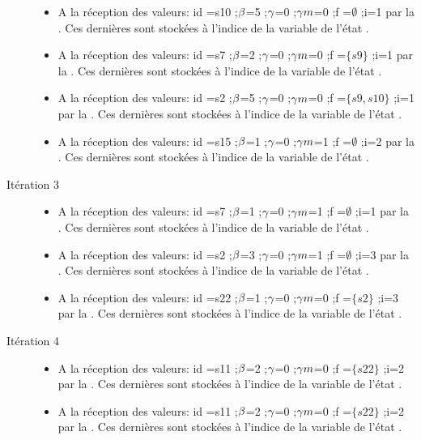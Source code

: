 \begin{Exemple}
\begin{description}
\begin{itemize}
			\item  A la réception des valeurs: id =s10 ;$\beta{}$=5 ;$\gamma{}$=0 ;$\gamma m{}$=0 ;f =$\emptyset$ ;i=1 par la \mtwo{}. Ces dernières sont stockées à l'indice  de la variable   de l'état .
			\item  A la réception des valeurs: id =s7 ;$\beta{}$=2 ;$\gamma{}$=0 ;$\gamma m{}$=0 ;f =$\{s9\}$ ;i=1 par la \mtwo{}. Ces dernières sont stockées à l'indice  de la variable   de l'état .
			\item  A la réception des valeurs: id =s2 ;$\beta{}$=5 ;$\gamma{}$=0 ;$\gamma m{}$=0 ;f =$\{s9,s10\}$ ;i=1 par la \mtree{}. Ces dernières sont stockées à l'indice  de la variable   de l'état .
			\item  A la réception des valeurs: id =s15 ;$\beta{}$=1 ;$\gamma{}$=0 ;$\gamma m{}$=1 ;f =$\emptyset$ ;i=2 par la \mtree{}. Ces dernières sont stockées à l'indice  de la variable   de l'état .
			\end{itemize}	
\item[Itération 3]
		\begin{itemize}
			\item  A la réception des valeurs: id =s7 ;$\beta{}$=1 ;$\gamma{}$=0 ;$\gamma m{}$=1 ;f =$\emptyset$ ;i=1 par la \mone{}. Ces dernières sont stockées à l'indice  de la variable   de l'état .
			\item  A la réception des valeurs: id =s2 ;$\beta{}$=3 ;$\gamma{}$=0 ;$\gamma m{}$=1 ;f =$\emptyset$ ;i=3 par la \mone{}. Ces dernières sont stockées à l'indice  de la variable   de l'état .
			\item  A la réception des valeurs: id =s22 ;$\beta{}$=1 ;$\gamma{}$=0 ;$\gamma m{}$=0 ;f =$\{s2\}$ ;i=3 par la \mtwo{}. Ces dernières sont stockées à l'indice  de la variable   de l'état .
			\end{itemize}
		\item[Itération 4]
		\begin{itemize}
			\item  A la réception des valeurs: id =s11 ;$\beta{}$=2 ;$\gamma{}$=0 ;$\gamma m{}$=0 ;f =$\{s22\}$ ;i=2 par la \mone{}. Ces dernières sont stockées à l'indice  de la variable   de l'état .
			\item  A la réception des valeurs: id =s11 ;$\beta{}$=2 ;$\gamma{}$=0 ;$\gamma m{}$=0 ;f =$\{s22\}$ ;i=2 par la \mtree{}. Ces dernières sont stockées à l'indice  de la variable   de l'état .

\end{itemize}
\end{description}
\end{Exemple}

